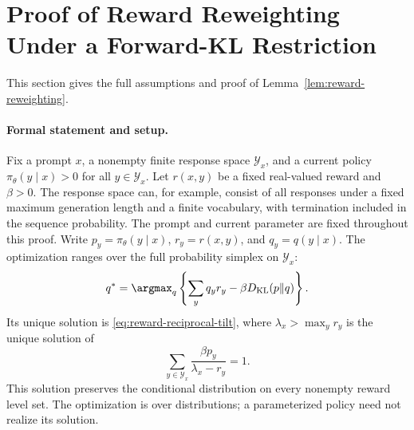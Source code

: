 \section{Proof of Reward Reweighting Under a Forward-KL Restriction}
\label{app:reward-reweighting}

This section gives the full assumptions and proof of
Lemma~\ref{lem:reward-reweighting}.

\paragraph{Formal statement and setup.}
Fix a prompt $x$, a nonempty finite response space $\mathcal Y_x$, and a
current policy $\pi_\theta(y\mid x)>0$ for all $y\in\mathcal Y_x$.
Let $r(x,y)$ be a fixed real-valued reward and $\beta>0$.
The response space
can, for example, consist of all responses under a fixed maximum generation
length and a finite vocabulary, with termination included in the sequence
probability. The prompt and current parameter are fixed throughout this
proof. Write $p_y=\pi_\theta(y\mid x)$, $r_y=r(x,y)$, and $q_y=q(y\mid x)$.
The optimization ranges over the full probability simplex on $\mathcal Y_x$:
\begin{equation}
 q^*=\argmax_q\left\{\sum_yq_yr_y
                    -\beta D_{\mathrm{KL}}(p\Vert q)\right\}.
 \label{eq:app-reward-forward-objective}
\end{equation}
Its unique solution is \eqref{eq:reward-reciprocal-tilt}, where
$\lambda_x>\max_y r_y$ is the unique solution of
\begin{equation}
 \sum_{y\in\mathcal Y_x}\frac{\beta p_y}{\lambda_x-r_y}=1.
 \label{eq:app-reward-normalization}
\end{equation}
This solution preserves the conditional distribution on every nonempty
reward level set. The optimization is over distributions; a parameterized
policy need not realize its solution.

